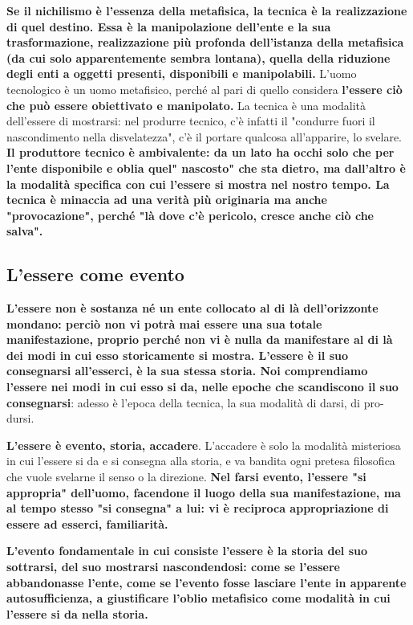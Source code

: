 \textbf{Se il nichilismo è l'essenza della metafisica,
la tecnica è la realizzazione di quel destino.
Essa è la manipolazione dell'ente e la sua
trasformazione, realizzazione più profonda
dell'istanza della metafisica (da cui solo apparentemente sembra lontana),
quella della riduzione degli enti a oggetti presenti,
disponibili e manipolabili.}
L'uomo tecnologico è un uomo metafisico, perché al
pari di quello considera \textbf{l'essere ciò che può essere
obiettivato e manipolato.}
La tecnica è una modalità dell'essere di
mostrarsi: nel produrre tecnico, c'è infatti il
"condurre fuori il nascondimento nella disvelatezza",
c'è il portare qualcosa all'apparire, lo svelare.
\textbf{Il produttore tecnico è ambivalente: da un lato
ha occhi solo che per l'ente disponibile e oblia
quel" nascosto" che sta dietro, ma dall'altro
è la modalità specifica con cui l'essere
si mostra nel nostro tempo. La tecnica
è minaccia ad una verità più originaria
ma anche "provocazione", perché "là dove c'è
pericolo, cresce anche ciò che salva".}

\subsection{L'essere come evento}


\textbf{L'essere non è sostanza né un ente collocato al di
là dell'orizzonte mondano: perciò non vi potrà
mai essere una sua totale manifestazione, proprio perché
non vi è nulla da manifestare al di là dei modi
in cui esso storicamente si mostra.
L'essere è il suo consegnarsi all'esserci, è
la sua stessa storia. Noi comprendiamo l'essere nei
modi in cui esso si da, nelle epoche che scandiscono il
suo consegnarsi}: adesso è l'epoca della tecnica, la
sua modalità di darsi, di pro-dursi.

\textbf{L'essere è evento, storia, accadere}. L'accadere è
solo la modalità misteriosa in cui l'essere si da e si
consegna alla storia, e va bandita ogni pretesa
filosofica che vuole svelarne il senso o la direzione.
\textbf{Nel farsi evento, l'essere "si appropria" dell'uomo,
facendone il luogo della sua manifestazione,
ma al tempo stesso "si consegna" a lui: vi è
reciproca appropriazione di essere ad esserci,
familiarità.}

\textbf{L'evento fondamentale in cui consiste l'essere è la
storia del suo sottrarsi, del suo mostrarsi nascondendosi:
come se l'essere abbandonasse l'ente, come se
l'evento fosse lasciare l'ente in apparente autosufficienza,
a giustificare l'oblio metafisico come modalità
in cui l'essere si da nella storia.}

